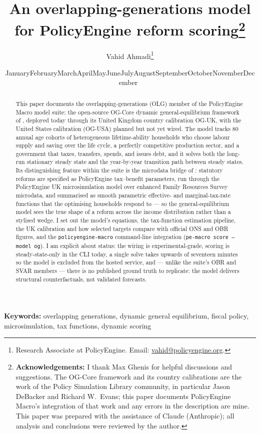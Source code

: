 \documentclass[11pt]{article}
\title{\bfseries An overlapping-generations model for PolicyEngine reform scoring\thanks{\textbf{Acknowledgements:} I thank Max Ghenis for helpful discussions and suggestions. The OG-Core framework and its country calibrations are the work of the Policy Simulation Library community, in particular Jason DeBacker and Richard W.\ Evans; this paper documents PolicyEngine Macro's integration of that work and any errors in the description are mine. This paper was prepared with the assistance of Claude (Anthropic); all analysis and conclusions were reviewed by the author.}\\[0.7cm]}
\author{Vahid Ahmadi\thanks{Research Associate at PolicyEngine. Email: \href{mailto:vahid@policyengine.org}{vahid@policyengine.org}.}}
\date{\small \ifcase\month\or January\or February\or March\or April\or May\or June\or July\or August\or September\or October\or November\or December\fi\ \the\year}
\begin{document}
\maketitle

\begin{abstract}
\noindent This paper documents the overlapping-generations (OLG) member of the PolicyEngine Macro model suite: the open-source OG-Core dynamic general-equilibrium framework of \citet{DeBackerEvans2024}, deployed today through its United Kingdom country calibration OG-UK, with the United States calibration (OG-USA) planned but not yet wired. The model tracks 80 annual age cohorts of heterogeneous lifetime-ability households who choose labour supply and saving over the life cycle, a perfectly competitive production sector, and a government that taxes, transfers, spends, and issues debt, and it solves both the long-run stationary steady state and the year-by-year transition path between steady states. Its distinguishing feature within the suite is the microdata bridge of \citet{DeBackerEvansPhillips2019}: statutory reforms are specified as PolicyEngine tax--benefit parameters, run through the PolicyEngine UK microsimulation model over enhanced Family Resources Survey microdata, and summarised as smooth parametric effective- and marginal-tax-rate functions that the optimising households respond to --- so the general-equilibrium model sees the true shape of a reform across the income distribution rather than a stylised wedge. I set out the model's equations, the tax-function estimation pipeline, the UK calibration and how selected targets compare with official ONS and OBR figures, and the \texttt{policyengine-macro} command-line integration (\texttt{pe-macro score --model og}). I am explicit about status: the wiring is experimental-grade, scoring is steady-state-only in the CLI today, a single solve takes upwards of seventeen minutes so the model is excluded from the hosted service, and --- unlike the suite's OBR and SVAR members --- there is no published ground truth to replicate: the model delivers structural counterfactuals, not validated forecasts.
\end{abstract}

\medskip
\noindent\textbf{Keywords:} overlapping generations, dynamic general equilibrium, fiscal policy, microsimulation, tax functions, dynamic scoring

\newpage













\end{document}
